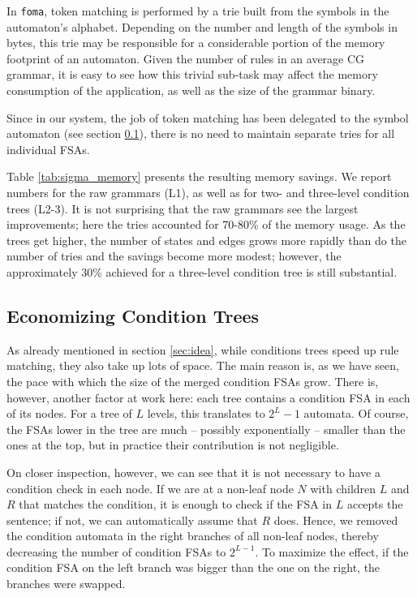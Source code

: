 \documentclass{article}
\begin{document}
In \texttt{foma}, token matching is performed by a trie built from the symbols
in the automaton's alphabet. Depending on the number and length of the symbols
in bytes, this trie may be responsible for a considerable portion of the memory
footprint of an automaton. Given the number of rules in an average CG grammar,
it is easy to see how this trivial sub-task may affect the memory consumption of
the application, as well as the size of the grammar binary.

Since in our system, the job of token matching has been delegated to the symbol
automaton (see section \ref{}), there is no need to maintain separate tries for
all individual FSAs. 

Table \ref{tab:sigma_memory} presents the resulting memory savings.
We report numbers for the raw grammars (L1), as well as for two- and three-level
condition trees (L2-3). It is not surprising that the raw grammars see the
largest improvements; here the tries accounted for 70-80\% of the memory
usage. As the trees get higher, the number of states and edges grows more
rapidly than do the number of tries and the savings become more modest; however,
the approximately 30\% achieved for a three-level condition tree is still
substantial.  %

\subsection{Economizing Condition Trees}

As already mentioned in section \ref{sec:idea}, while conditions trees speed up
rule matching, they also take up lots of space. The main reason is, as we have
seen, the pace with which the size of the merged condition FSAs grow. There is,
however, another factor at work here: each tree contains a condition FSA in each
of its nodes. For a tree of $L$ levels, this translates to $2^L - 1$ automata.
Of course, the FSAs lower in the tree are much -- possibly exponentially --
smaller than the ones at the top, but in practice their contribution is not
negligible.

On closer inspection, however, we can see that it is not necessary to have a
condition check in each node. If we are at a non-leaf node $N$ with children
$L$ and $R$ that matches the condition, it is enough to check if the FSA in
$L$ accepts the sentence; if not, we can automatically assume that $R$ does.
Hence, we removed the condition automata in the right branches of all non-leaf
nodes, thereby decreasing the number of condition FSAs to $2^{L-1}$. To maximize
the effect, if the condition FSA on the left branch was bigger than the one on
the right, the branches were swapped.
\end{document}
